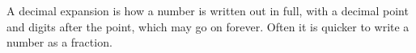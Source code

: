 A decimal expansion is how a number is written
out in full, with a decimal point and digits after
the point, which may go on forever. Often it is
quicker to write a number as a fraction.
